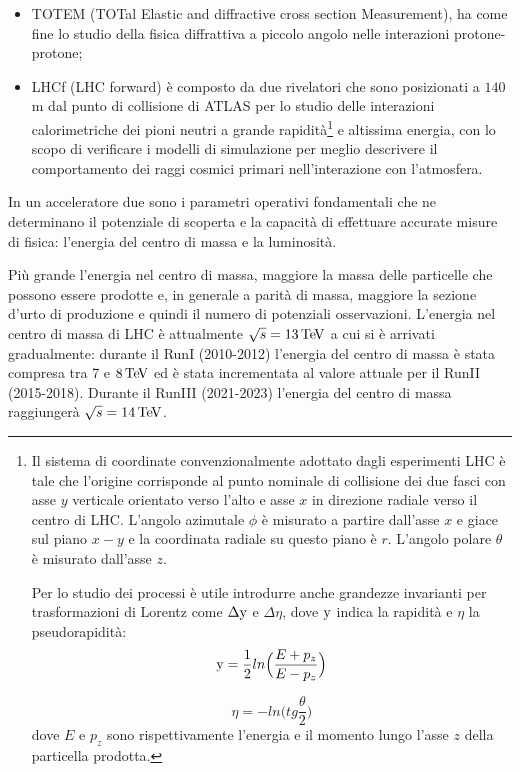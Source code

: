 \begin{itemize}
\item TOTEM (TOTal Elastic and diffractive cross section Measurement), ha come fine lo studio della fisica diffrattiva a piccolo angolo nelle interazioni protone-protone;
\item LHCf (LHC forward) è composto da due rivelatori che sono posizionati a $140$m dal punto di collisione di ATLAS per lo studio delle interazioni calorimetriche dei pioni neutri a grande rapidità\footnote{
Il sistema di coordinate convenzionalmente adottato dagli esperimenti LHC è tale che l'origine corrisponde al punto nominale di collisione dei due fasci con asse $y$ verticale orientato verso l'alto e asse $x$ in direzione radiale verso il centro di LHC. L'angolo azimutale $\phi$ è misurato a partire dall'asse $x$ e giace sul piano $x-y$ e la coordinata radiale su questo piano è $r$. L'angolo polare $\theta$ è misurato dall'asse $z$. 

Per lo studio dei processi è utile introdurre anche grandezze invarianti per trasformazioni di Lorentz come $\Delta {\rm y}$ e $\Delta \eta$, dove ${\rm y}$ indica la rapidità e $\eta$ la pseudorapidità:
\begin{equation}
{\rm y} = \dfrac{1}{2} ln\Big( \dfrac{E+p_z}{E-p_z}\Big)
\end{equation}

\begin{equation}
\eta = - ln \Big( tg\frac{\theta}{2}\Big)
\end{equation}
dove $E$ e $p_z$ sono rispettivamente l'energia e il momento lungo l'asse $z$ della particella prodotta. 
} e altissima energia, con lo scopo di verificare i modelli di simulazione per meglio descrivere il comportamento dei raggi cosmici primari nell'interazione con l'atmosfera.
\end{itemize}

In un acceleratore due sono i parametri operativi fondamentali che ne determinano il potenziale di scoperta e la capacit\`a di effettuare accurate misure di fisica: l'energia del centro di massa e la luminosit\`a.

Pi\`u grande l'energia nel centro di massa, maggiore la massa delle particelle che possono essere prodotte e, in generale a parit\`a di massa, maggiore la sezione d'urto di produzione e quindi il numero di potenziali osservazioni. L'energia nel centro di massa di LHC \`e attualmente $\sqrt{s}=13{\rm \, Te\kern-0.125em V}$ a cui si \`e arrivati gradualmente: durante il RunI (2010-2012) l'energia del centro di massa \`e stata compresa tra 7 e $8{\rm \, Te\kern-0.125em V}$ ed \`e stata incrementata al valore attuale per il RunII (2015-2018). Durante il RunIII (2021-2023) l'energia del centro di massa raggiunger\`a $\sqrt{s}=14{\rm \, Te\kern-0.125em V}$.

